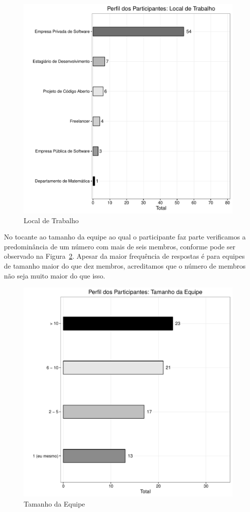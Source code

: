 \begin{figure}[htpb]
	\centering
	\includegraphics[width=0.8\linewidth]{./chapter-pesquisa-com-profissionais/img/grafico_melhorias_fgrm_local_trabalho.pdf}
	\caption{Local de Trabalho}
\label{fig:grafico_melhorias_fgrm_local_trabalho}
\end{figure}

No tocante ao tamanho da equipe ao qual o participante faz parte verificamos a
predominância de um número com mais de seis membros, conforme pode ser observado
na Figura~\ref{fig:grafico_melhorias_fgrm_tamanho_equipe}. Apesar da maior
frequência de respostas é para equipes de tamanho maior do que dez membros,
acreditamos que o número de membros não seja muito maior do que isso.

\begin{figure}[htpb]
	\centering
	\includegraphics[width=0.8\linewidth]{./chapter-pesquisa-com-profissionais/img/grafico_melhorias_fgrm_tamanho_equipe.pdf}
	\caption{Tamanho da Equipe}
\label{fig:grafico_melhorias_fgrm_tamanho_equipe}
\end{figure}

